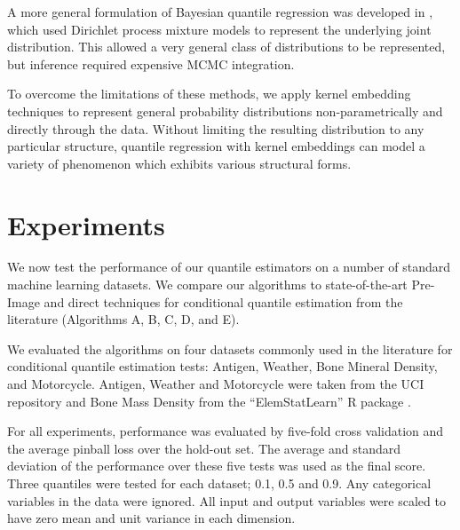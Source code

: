 \documentclass[twoside]{article} \usepackage{aistats2017}
\theoremstyle{definition}
\theoremstyle{theorem}
\begin{document}
	A more general formulation of Bayesian quantile regression was developed in \cite{taddy2012bayesian}, which used Dirichlet process mixture models to represent the underlying joint distribution. This allowed a very general class of distributions to be represented, but inference required expensive MCMC integration.
	
	To overcome the limitations of these methods, we apply kernel embedding techniques to represent general probability distributions non-parametrically and directly through the data. Without limiting the resulting distribution to any particular structure, quantile regression with kernel embeddings can model a variety of phenomenon which exhibits various structural forms.
	
% 
% 
	

	
\section{Experiments}
\label{sec:experiments}
		
	We now test the performance of our quantile estimators on a number of standard machine learning datasets. We compare our algorithms to state-of-the-art Pre-Image and direct techniques for conditional quantile estimation from the literature (Algorithms A, B, C, D, and E). %
	
	We evaluated the algorithms on four datasets commonly used in the literature for conditional quantile estimation tests: Antigen, Weather, Bone Mineral Density, and Motorcycle. Antigen, Weather and Motorcycle were taken from the UCI repository \citep{lichman2013uci} and Bone Mass Density from the ``ElemStatLearn'' R package \citep{hastie2005the}.
	
	For all experiments, performance was evaluated by five-fold cross validation and the average pinball loss over the hold-out set. The average and standard deviation of the performance over these five tests was used as the final score. Three quantiles were tested for each dataset; 0.1, 0.5 and 0.9. Any categorical variables in the data were ignored. All input and output variables were scaled to have zero mean and unit variance in each dimension.
	
\end{document}
